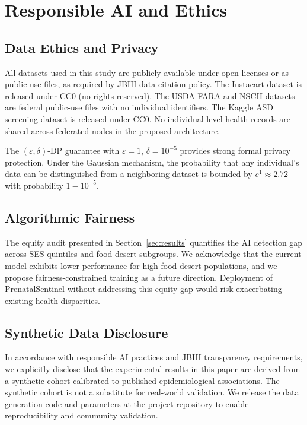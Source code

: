 \documentclass[journal]{IEEEtran}
\newcommand{\eps}{\varepsilon}
\begin{document}
\section{Responsible AI and Ethics}
\label{sec:ethics}

\subsection{Data Ethics and Privacy}

All datasets used in this study are publicly available under open
licenses or as public-use files, as required by JBHI data citation
policy. The Instacart dataset is released under CC0 (no rights
reserved). The USDA FARA and NSCH datasets are federal public-use
files with no individual identifiers. The Kaggle ASD screening
dataset is released under CC0. No individual-level health records
are shared across federated nodes in the proposed architecture.

The $(\eps,\delta)$-DP guarantee with $\eps=1$, $\delta=10^{-5}$
provides strong formal privacy protection. Under the Gaussian
mechanism, the probability that any individual's data can be
distinguished from a neighboring dataset is bounded by $e^1 \approx 2.72$
with probability $1-10^{-5}$.

\subsection{Algorithmic Fairness}

The equity audit presented in Section~\ref{sec:results} quantifies
the AI detection gap across SES quintiles and food desert subgroups.
We acknowledge that the current model exhibits lower performance
for high food desert populations, and we propose fairness-constrained
training as a future direction. Deployment of PrenatalSentinel
without addressing this equity gap would risk exacerbating existing
health disparities.

\subsection{Synthetic Data Disclosure}

In accordance with responsible AI practices and JBHI transparency
requirements, we explicitly disclose that the experimental results
in this paper are derived from a synthetic cohort calibrated to
published epidemiological associations. The synthetic cohort is
not a substitute for real-world validation. We release the data
generation code and parameters at the project repository to enable
reproducibility and community validation.
\end{document}
